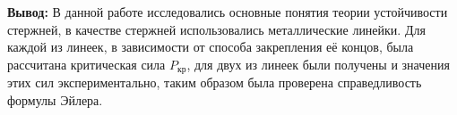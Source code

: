 \documentclass[a4paper,12pt]{article}
\begin{document}
\textbf{Вывод:} В данной работе исследовались основные понятия теории устойчивости стержней, в качестве стержней использовались металлические линейки. Для каждой из линеек, в зависимости от способа закрепления её концов, была рассчитана критическая сила $P_{кр}$, для двух из линеек были получены и значения этих сил экспериментально, таким образом была проверена справедливость формулы Эйлера.
\end{document}
